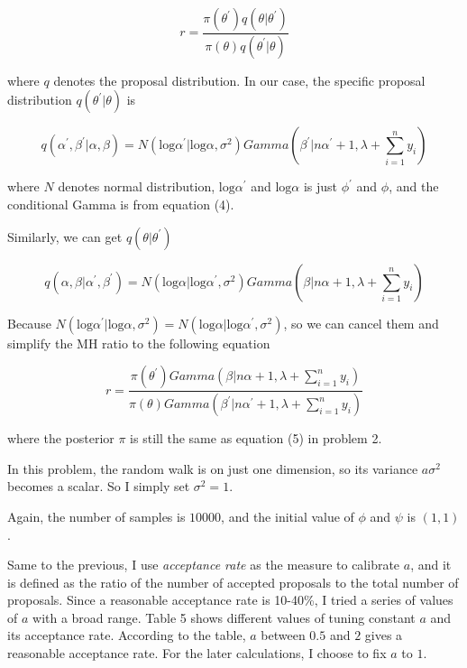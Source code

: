 \documentclass[12pt]{article}
\begin{document}
\begin{equation}
r = \frac{\pi(\theta^{\prime})q(\theta|\theta^{\prime})}{\pi(\theta)q(\theta^{\prime}|\theta)}
\end{equation} 

where $q$ denotes the proposal distribution. In our case, the specific proposal distribution $q(\theta^{\prime}|\theta)$ is

\begin{equation}
q(\alpha^{\prime},\beta^{\prime}|\alpha,\beta)=N(\text{log}\alpha^{\prime}|\text{log}\alpha,\sigma^2)Gamma(\beta^{\prime}|n\alpha^{\prime}+1, \lambda+\sum_{i=1}^n y_i)
\end{equation}

where $N$ denotes normal distribution, $\text{log}\alpha^{\prime}$ and $\text{log}\alpha$ is just $\phi^{\prime}$ and $\phi$, and the conditional Gamma is from equation (4).

Similarly, we can get $q(\theta|\theta^{\prime})$  

\begin{equation}
q(\alpha,\beta|\alpha^{\prime},\beta^{\prime})=N(\text{log}\alpha|\text{log}\alpha^{\prime},\sigma^2)Gamma(\beta|n\alpha+1, \lambda+\sum_{i=1}^n y_i)
\end{equation}

Because $N(\text{log}\alpha^{\prime}|\text{log}\alpha,\sigma^2)=N(\text{log}\alpha|\text{log}\alpha^{\prime},\sigma^2)$, so we can cancel them and simplify the MH ratio to the following equation

\begin{equation}
r = \frac{\pi(\theta^{\prime})Gamma(\beta|n\alpha+1, \lambda+\sum_{i=1}^n y_i)}{\pi(\theta)Gamma(\beta^{\prime}|n\alpha^{\prime}+1, \lambda+\sum_{i=1}^n y_i)}
\end{equation} 

where the posterior $\pi$ is still the same as equation (5) in problem 2.

In this problem, the random walk is on just one dimension, so its variance $a\sigma^2$ becomes a scalar. So I simply set $\sigma^2=1$.

Again, the number of samples is $10000$, and the initial value of $\phi$ and $\psi$ is $(1,1)$.

Same to the previous, I use \textit{acceptance rate} as the measure to calibrate $a$, and it is defined as the ratio of the number of accepted proposals to the total number of proposals. Since a reasonable acceptance rate is 10-40\%, I tried a series of values of $a$ with a broad range. Table 5 shows different values of tuning constant $a$ and its acceptance rate. According to the table, $a$ between $0.5$ and $2$ gives a reasonable acceptance rate. For the later calculations, I choose to fix $a$ to $1$.
\end{document}

